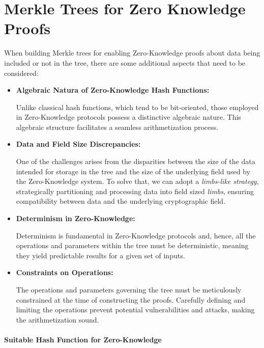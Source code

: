 \section{Merkle Trees for Zero Knowledge Proofs} \label{sec:merkle-tree-zero-knowledge}

When building Merkle trees for enabling Zero-Knowledge proofs about data being included or not in the tree, there are some additional aspects that need to be considered:

\begin{itemize}

\item \textbf{Algebraic Natura of Zero-Knowledge Hash Functions:}

Unlike classical hash functions, which tend to be bit-oriented, those employed in Zero-Knowledge protocols possess a distinctive algebraic nature. This algebraic structure facilitates a seamless arithmetization process.

\item \textbf{Data and Field Size Discrepancies:}

One of the challenges arises from the disparities between the size of the data intended for storage in the tree and the size of the underlying field used by the Zero-Knowledge system. To solve that, we can adopt a \textit{limbs-like strategy}, strategically partitioning and processing data into field sized \textit{limbs}, ensuring compatibility between data and the underlying cryptographic field.

\item \textbf{Determinism in Zero-Knowledge:}

Determinism is fundamental in Zero-Knowledge protocols and, hence, all the operations and parameters within the tree must be deterministic, meaning they yield predictable results for a given set of inputs.

\item \textbf{Constraints on Operations:}

The operations and parameters governing the tree must be meticulously constrained at the time of constructing the proofs. Carefully defining and limiting the operations prevent potential vulnerabilities and attacks, making the arithmetization sound.

\end{itemize}

\paragraph*{Suitable Hash Function for Zero-Knowledge}

